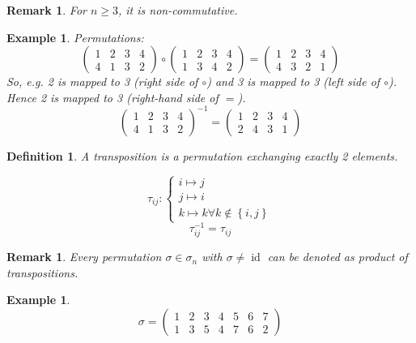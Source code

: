 \documentclass{article}
\newcounter{lecref}[section]
\numberwithin{lecref}{section}
\newtheorem{example}[lecref]{Example}
\newtheorem{definition}[lecref]{Definition}
\newtheorem{remark}[lecref]{Remark}
\newcommand{\set}[1]{\left\{#1\right\}}
\begin{document}
\begin{remark} %
  For $n \geq 3$, it is non-commutative.
\end{remark}

\begin{example} %
  Permutations:
  \[ \begin{pmatrix} 1 & 2 & 3 & 4 \\ 4 & 1 & 3 & 2 \end{pmatrix} \circ \begin{pmatrix} 1 & 2 & 3 & 4 \\ 1 & 3 & 4 & 2 \end{pmatrix} = \begin{pmatrix} 1 & 2 & 3 & 4 \\ 4 & 3 & 2 & 1 \end{pmatrix} \]
  So, e.g. 2 is mapped to 3 (right side of $\circ$) and 3 is mapped to 3 (left side of $\circ$). Hence 2 is mapped to 3 (right-hand side of $=$).
  \[ \begin{pmatrix} 1 & 2 & 3 & 4 \\ 4 & 1 & 3 & 2 \end{pmatrix}^{-1} = \begin{pmatrix} 1 & 2 & 3 & 4 \\ 2 & 4 & 3 & 1 \end{pmatrix} \]
\end{example}

\begin{definition}
  A \emph{transposition} is a permutation exchanging exactly 2 elements.

  \[
    \tau_{ij} : \begin{cases}
      i \mapsto j \\
      j \mapsto i \\
      k \mapsto k \forall k \notin \set{i,j}
    \end{cases}
  \] \[
    \tau_{ij}^{-1} = \tau_{ij}
  \]
\end{definition}

\begin{remark}
  Every permutation $\sigma \in \sigma_n$ with $\sigma \neq \operatorname{id}$ can be denoted as product of transpositions.
\end{remark}

\begin{example}
  \[ \sigma = \begin{pmatrix} 1 & 2 & 3 & 4 & 5 & 6 & 7 \\ 1 & 3 & 5 & 4 & 7 & 6 & 2 \end{pmatrix} \]
\end{example}
\end{document}
